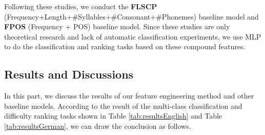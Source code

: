 Following these studies, we conduct the \textbf{FLSCP} (Frequency+Length+\#Syllables+\#Consonant+\#Phonemes) baseline model and \textbf{FPOS} (Frequency + POS) baseline model.
Since these studies are only theoretical research and lack of automatic classification experiments, we use MLP to do the classification and ranking tasks based on these compound features.

\subsection{Results and Discussions}
\label{sec:res}
In this part, we discuss the results of our feature engineering method and other baseline models.
According to the result of the multi-class classification and difficulty ranking tasks shown in Table \ref{tab:resultsEnglish} and Table \ref{tab:resultsGerman}, we can draw the conclusion as follows.
